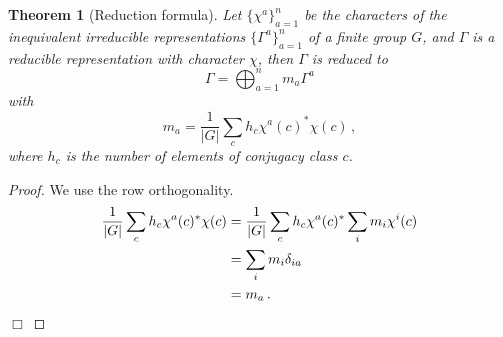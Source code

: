 \documentclass{article}
\theoremstyle{plain}\theoremheaderfont{\normalfont\itshape}\theorembodyfont{\rmfamily}\theoremseparator{.}\newtheorem*{rem}{Remark}\newtheorem*{ex}{Example}\newtheorem*{proof}{Proof}\newtheorem*{altp}{Alternative proof}
\theoremstyle{plain}\theoremheaderfont{\normalfont\bfseries}\theorembodyfont{\rmfamily}\theoremseparator{.}\newtheorem{thm}{Theorem}[section]\newtheorem{lem}[thm]{Lemma}\newtheorem{prop}[thm]{Proposition}\newtheorem*{cor}{Corollary}\newtheorem{defn}[thm]{Definition}\newtheorem{clm}[thm]{Claim}\newtheorem{clminproof}{Claim}\newtheorem*{law}{Law}\newtheorem{pos}[thm]{Postulate}
\theoremstyle{break}\theoremheaderfont{\normalfont\itshape}\theorembodyfont{\rmfamily}\theoremseparator{.\medskip}\newtheorem*{proofskip}{Proof}\newtheorem*{exs}{Examples}\newtheorem*{rems}{Remarks}
\theoremstyle{break}\theoremheaderfont{\normalfont\bfseries}\theorembodyfont{\rmfamily}\theoremseparator{.\medskip}\newtheorem{lemskip}[thm]{Lemma}\newtheorem{defnskip}[thm]{Definition}\newtheorem{propskip}[thm]{Proposition}\newtheorem{thmskip}[thm]{Theorem}
\numberwithin{equation}{section}
\newcommand{\qed}{\hfill\ensuremath{\Box}}
\newcommand{\abs}[1]{\left| #1 \right|}
\begin{document}
    \begin{thm}[Reduction formula]
        Let \(\{\chi^{a}\}_{a=1}^{n}\) be the characters of the inequivalent irreducible representations \(\{\Gamma^a\}_{a=1}^{n}\) of a finite group \(G\), and \(\Gamma\) is a reducible representation with character \(\chi\), then \(\Gamma\) is reduced to
        \begin{equation}
            \Gamma=\bigoplus_{a=1}^{n}m_a\Gamma^a
        \end{equation}
        with
        \begin{equation}
            m_a=\frac{1}{\abs{G}}\sum_c h_c\chi^{a}(c)^*\chi(c)\,,
        \end{equation}
        where \(h_c\) is the number of elements of conjugacy class \(c\).
    \end{thm}
    \begin{proof}
        We use the row orthogonality.
        \begin{align}
            \frac{1}{\abs{G}}\sum_c h_c\chi^a(c)^*\chi(c)&=\frac{1}{\abs{G}}\sum_c h_c\chi^a(c)^*\sum_i m_i\chi^i(c)\notag\\
            &=\sum_i m_i\delta_{ia}\notag\\
            &=m_a\,.
        \end{align}\qed
    \end{proof}
\end{document}
